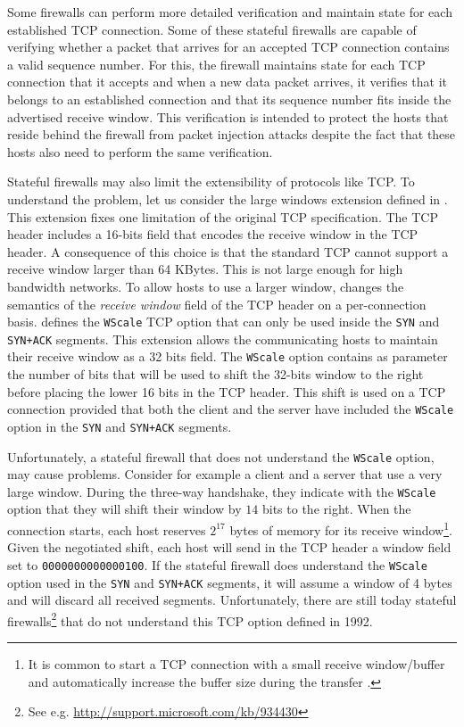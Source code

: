 Some firewalls can perform more detailed verification and maintain state for each established TCP connection. Some of these stateful firewalls are capable of verifying whether a packet that arrives for an accepted TCP connection contains a valid sequence number. For this, the firewall maintains state for each TCP connection that it accepts and when a new data packet arrives, it verifies that it belongs to an established connection and that its sequence number fits inside the advertised receive window. This verification is intended to protect the hosts that reside behind the firewall from packet injection attacks despite the fact that these hosts also need to perform the same verification. 

Stateful firewalls may also limit the extensibility of protocols like TCP. To understand the problem, let us consider the large windows extension defined in \cite{rfc1323}. This extension fixes one limitation of the original TCP specification. The TCP header \cite{rfc793} includes a 16-bits field that encodes the receive window in the TCP header. A consequence of this choice is that the standard TCP cannot support a receive window larger than 64 KBytes. This is not large enough for high bandwidth networks. To allow hosts to use a larger window, \cite{rfc1323} changes the semantics of the \emph {receive window} field of the TCP header on a per-connection basis. \cite{rfc1323} defines the \texttt{WScale} TCP option that can only be used inside the \texttt{SYN} and \texttt{SYN+ACK} segments. This extension allows the communicating hosts to maintain their receive window as a 32 bits field. The \texttt{WScale} option contains as parameter the number of bits that will be used to shift the 32-bits window to the right before placing the lower 16 bits in the TCP header. This shift is used on a TCP connection provided that both the client and the server have included the \texttt{WScale} option in the \texttt{SYN} and \texttt{SYN+ACK} segments.

Unfortunately, a stateful firewall that does not understand the \texttt{WScale} option, may cause problems. Consider for example a client and a server that use a very large window. During the three-way handshake, they indicate with the \texttt{WScale} option that they will shift their window by $14$ bits to the right. When the connection starts, each host reserves $2^{17}$ bytes of memory for its receive window\footnote{It is common to start a TCP connection with a small receive window/buffer and automatically increase the buffer size during the transfer \cite{Semke:1998hf}.}. Given the negotiated shift, each host will send in the TCP header a window field set to \texttt{0000000000000100}. If the stateful firewall does understand the \texttt{WScale} option used in the \texttt{SYN} and \texttt{SYN+ACK} segments, it will assume a window of 4 bytes and will discard all received segments. Unfortunately, there are still today stateful firewalls\footnote{See e.g. \url{http://support.microsoft.com/kb/934430}} that do not understand this TCP option defined in 1992.

